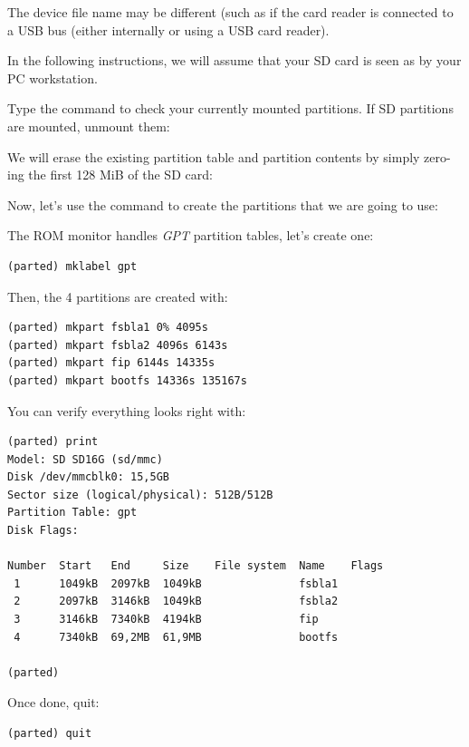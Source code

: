 The device file name may be different (such as 
if the card reader is connected to a USB bus (either internally
or using a USB card reader).

In the following instructions, we will assume that your SD card is
seen as  by your PC workstation.

Type the  command to check your currently mounted
partitions. If SD partitions are mounted, unmount them:


We will erase the existing partition table and partition contents
by simply zero-ing the first 128 MiB of the SD card:


Now, let's use the  command to create the partitions that
we are going to use:


The ROM monitor handles {\em GPT} partition tables, let's create one:

\begin{verbatim}
(parted) mklabel gpt
\end{verbatim}

Then, the 4 partitions are created with:
\begin{verbatim}
(parted) mkpart fsbla1 0% 4095s
(parted) mkpart fsbla2 4096s 6143s
(parted) mkpart fip 6144s 14335s
(parted) mkpart bootfs 14336s 135167s
\end{verbatim}

You can verify everything looks right with:

\begin{verbatim}
(parted) print
Model: SD SD16G (sd/mmc)
Disk /dev/mmcblk0: 15,5GB
Sector size (logical/physical): 512B/512B
Partition Table: gpt
Disk Flags: 

Number  Start   End     Size    File system  Name    Flags
 1      1049kB  2097kB  1049kB               fsbla1
 2      2097kB  3146kB  1049kB               fsbla2
 3      3146kB  7340kB  4194kB               fip
 4      7340kB  69,2MB  61,9MB               bootfs

(parted)
\end{verbatim}

Once done, quit:
\begin{verbatim}
(parted) quit
\end{verbatim}

